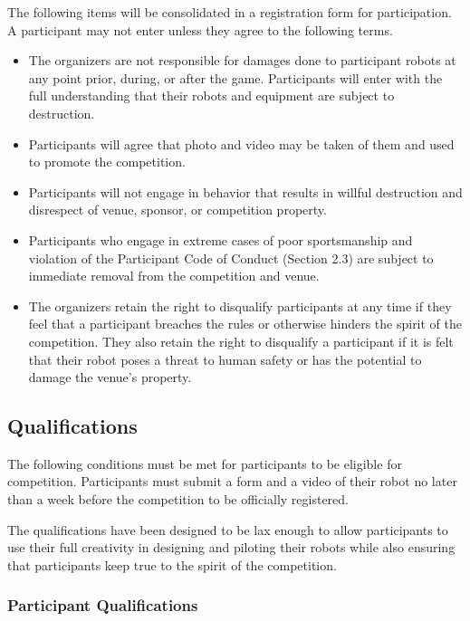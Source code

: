 \documentclass{article}
\begin{document}
	   	The following items will be consolidated in a registration form for participation. A participant may not enter unless they agree to the following terms.
		
		\begin{itemize}
  			\item  The organizers are not responsible for damages done to participant robots at any point prior, during, or after the game. Participants will enter with the full understanding that their robots and equipment are subject to destruction.
 			\item Participants will agree that photo and video may be taken of them and used to promote the competition.
  			\item Participants will not engage in behavior that results in willful destruction and disrespect of venue, sponsor, or competition property.
 			\item Participants who engage in extreme cases of poor sportsmanship and violation of the Participant Code of Conduct (Section 2.3) are subject to immediate removal from the competition and venue.
  			\item The organizers retain the right to disqualify participants at any time if they feel that a participant breaches the rules or otherwise hinders the spirit of the competition. They also retain the right to disqualify a participant if it is felt that their robot poses a threat to human safety or has the potential to damage the venue's property.
		\end{itemize}


	   
	   \subsection {Qualifications}
	   
	   	The following conditions must be met for participants to be eligible for competition. Participants must submit a form and a video of their robot no later than a week before the competition to be officially registered.
		
		The qualifications have been designed to be lax enough to allow participants to use their full creativity in designing and piloting their robots while also ensuring that participants keep true to the spirit of the competition.
	   	
		
	  	 \subsubsection {Participant Qualifications}	
	   
\end{document}
